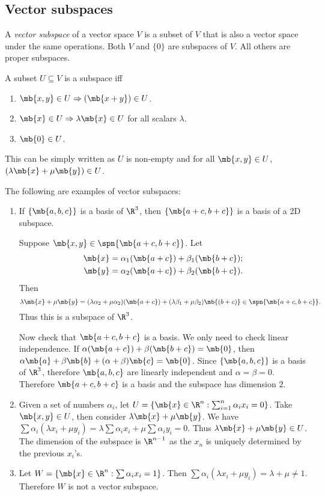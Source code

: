 \documentclass[a4paper]{article}
\begin{document}
\subsection{Vector subspaces}
\begin{defi}
  A \emph{vector subspace} of a vector space $V$ is a subset of $V$ that is also a vector space under the same operations. Both $V$ and $\{0\}$ are subspaces of $V$. All others are proper subspaces.

A subset $U\subseteq V$ is a subspace iff
\begin{enumerate}
\item $\mb{x, y}\in U \Rightarrow (\mb{x + y}) \in U$.
\item $\mb{x}\in U \Rightarrow \lambda\mb{x} \in U$ for all scalars $\lambda$.
\item $\mb{0}\in U$.
\end{enumerate}
This can be simply written as $U$ is non-empty and  for all $\mb{x, y}\in U$, $(\lambda\mb{x} + \mu\mb{y})\in U$.
\end{defi}

\begin{eg}
  The following are examples of vector subspaces:
  \begin{enumerate}
  \item If $\{\mb{a, b, c}\}$ is a basis of $\R^3$, then $\{\mb{a + c, b + c}\}$ is a basis of a 2D subspace.

  Suppose $\mb{x, y}\in \spn\{\mb{a + c, b + c}\}$. Let
  \begin{align*}
    \mb{x} &= \alpha_1(\mb{a + c}) + \beta_1(\mb{b + c});\\
    \mb{y} &= \alpha_2(\mb{a + c}) + \beta_2(\mb{b + c}).
  \end{align*}
  Then
  \[
  \lambda\mb{x} + \mu\mb{y} = (\lambda\alpha_2+\mu\alpha_2)(\mb{a + c}) + (\lambda\beta_1 + \mu\beta_2)\mb{(b + c)}\in\spn\{\mb{a + c, b + c}\}.
  \]
  Thus this is a subspace of $\R^3$.

  Now check that $\mb{a + c, b + c}$ is a basis. We only need to check linear independence. If $\alpha(\mb{a + c}) + \beta(\mb{b + c}) = \mb{0}$, then $\alpha\mb{a} + \beta\mb{b} + (\alpha + \beta)\mb{c} = \mb{0}$. Since $\{\mb{a, b, c}\}$ is a basis of $\R^3$, therefore $\mb{a, b, c}$ are linearly independent and $\alpha = \beta = 0$. Therefore $\mb{a + c, b + c}$ is a basis and the subspace has dimension $2$.
  \item Given a set of numbers $\alpha_i$, let $U = \{\mb{x}\in \R^n: \sum_{i=1}^n \alpha_ix_i = 0\}$. Take $\mb{x, y}\in U$, then consider $\lambda\mb{x} + \mu\mb{y}$. We have $\sum\alpha_i(\lambda x_i + \mu y_i) = \lambda\sum\alpha_ix_i + \mu\sum\alpha_iy_i = 0$. Thus $\lambda\mb{x} + \mu\mb{y} \in U$. The dimension of the subspace is $\R^{n-1}$ as the $x_n$ is uniquely determined by the previous $x_i$'s.
  \item Let $W = \{\mb{x}\in \R^n: \sum \alpha_ix_i = 1\}$. Then $\sum\alpha_i(\lambda x_i + \mu y_i) = \lambda + \mu \not= 1$. Therefore $W$ is not a vector subspace.
  \end{enumerate}
\end{eg}
\end{document}

